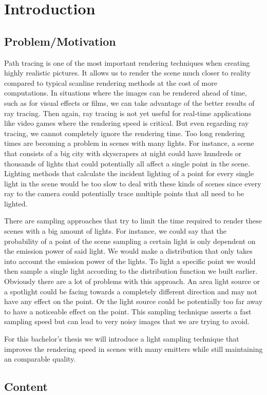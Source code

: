 
\chapter{Introduction}
\label{ch:Introduction}

\section{Problem/Motivation}
\label{sec:Introduction:Motivation}

Path tracing is one of the most important rendering techniques when creating highly realistic pictures. It allows us to render the scene much closer to reality compared to typical scanline rendering methods at the cost of more computations. In situations where the images can be rendered ahead of time, such as for visual effects or films, we can take advantage of the better results of ray tracing. Then again, ray tracing is not yet useful for real-time applications like video games where the rendering speed is critical. But even regarding ray tracing, we cannot completely ignore the rendering time. Too long rendering times are becoming a problem in scenes with many lights. For instance, a scene that consists of a big city with skyscrapers at night could have hundreds or thousands of lights that could potentially all affect a single point in the scene. Lighting methods that calculate the incident lighting of a point for every single light in the scene would be too slow to deal with these kinds of scenes since every ray to the camera could potentially trace multiple points that all need to be lighted.

There are sampling approaches that try to limit the time required to render these scenes with a big amount of lights. For instance, we could say that the probability of a point of the scene sampling a certain light is only dependent on the emission power of said light. We would make a distribution that only takes into account the emission power of the lights. To light a specific point we would then sample a single light according to the distribution function we built earlier. Obviously there are a lot of problems with this approach. An area light source or a spotlight could be facing towards a completely different direction and may not have any effect on the point. Or the light source could be potentially too far away to have a noticeable effect on the point. This sampling technique asserts a fast sampling speed but can lead to very noisy images that we are trying to avoid.

For this bachelor's thesis we will introduce a light sampling technique that improves the rendering speed in scenes with many emitters while still maintaining an comparable quality.

\section{Content}
\label{sec:Introduction:Content}